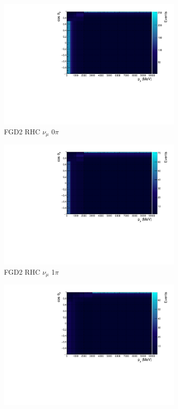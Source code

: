\begin{figure}
\begin{subfigure}{.32\textwidth}
  \includegraphics[width=0.95\linewidth]{figs/TH2D_MC_FGD2_NuMuBkg_CC0pi_in_AntiNu_Mode}
  \caption{FGD2 RHC $\nu_{\mu}$ 0$\pi$}
  \label{fig:th2dFGD2_NuMuBkg_CC0pi_in_AntiNu_Mode}
\end{subfigure}
\begin{subfigure}{.32\textwidth}
  \centering
  \includegraphics[width=0.95\linewidth]{figs/TH2D_MC_FGD2_NuMuBkg_CC1pi_in_AntiNu_Mode}
  \caption{FGD2 RHC $\nu_{\mu}$ 1$\pi$}
  \label{fig:th2dFGD2_NuMuBkg_CC1pi_in_AntiNu_Mode}
\end{subfigure}
\begin{subfigure}{.32\textwidth}
  \centering
  \includegraphics[width=0.95\linewidth]{figs/TH2D_MC_FGD2_NuMuBkg_CCOther_in_AntiNu_Mode}

\end{subfigure}
\end{figure}

